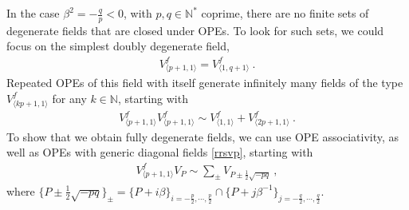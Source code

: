 \documentclass[12pt, a4paper]{article}
\theoremstyle{break}
\begin{document}
In the case $\beta^2=-\frac{q}{p}<0$, with $p,q\in\mathbb{N}^*$ coprime, there are no finite sets of degenerate fields that are closed under OPEs. To look for such sets, we could focus on the simplest doubly degenerate field, 
\begin{align}
 V^f_{\langle p+1,1\rangle}=V^f_{\langle 1,q+1\rangle}\ .
\end{align}
Repeated OPEs of this field with itself generate infinitely many fields of the type $V^f_{\langle kp+1,1\rangle}$ for any $k\in\mathbb{N}$, starting with 
\begin{align}
 V^f_{\langle p+1,1\rangle}V^f_{\langle p+1,1\rangle}\sim V^f_{\langle 1,1\rangle} + V^f_{\langle 2p+1,1\rangle}\ .
 \label{rfppo}
\end{align}
To show that we obtain fully degenerate fields, we can use OPE associativity, as well as OPEs with generic diagonal fields \eqref{rrsvp}, starting with 
\begin{align}
 V^f_{\langle p+1,1\rangle}  V_P \sim \sum_{\pm} V_{P\pm \frac12\sqrt{-pq}}\ ,
\end{align}
where $\{P\pm \frac12\sqrt{-pq}\}_\pm = \{P+i\beta\}_{i=-\frac{p}{2},\cdots, \frac{p}{2}} \cap \{P+j\beta^{-1}\}_{j=-\frac{q}{2},\cdots, \frac{q}{2}}$. 
\end{document}
